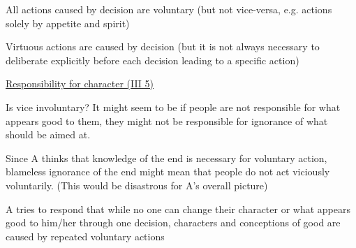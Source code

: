 \documentclass[11pt]{article}
\begin{document}
\noindent [4] All actions caused by decision are voluntary (but not vice-versa, e.g. actions solely by appetite and spirit)
\vspace*{1mm}

\noindent [5] Virtuous actions are caused by decision (but it is not always necessary to deliberate explicitly before each decision leading to a specific action)
\vspace*{3mm}

\noindent\underline{Responsibility for character (III 5)}
\vspace*{2mm}

\noindent Is vice involuntary? It might seem to be if people are not responsible for what appears good to them, they might not be responsible for ignorance of what should be aimed at.
\vspace*{1mm}

\noindent Since A thinks that knowledge of the end is necessary for voluntary action, blameless ignorance of the end might mean that people do not act viciously voluntarily. (This would be disastrous for A's overall picture)
\vspace*{1mm}

\noindent A tries to respond that while no one can change their character or what appears good to him/her through one decision, characters and conceptions of good are caused by repeated voluntary actions
\end{document}
